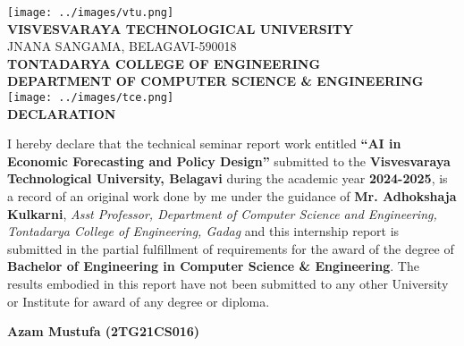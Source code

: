 \begin{titlepage}
    \thispagestyle{empty}
    \centering

    \texttt{[image: ../images/vtu.png]}\\[0.3cm]

    {\LARGE\bfseries{VISVESVARAYA TECHNOLOGICAL UNIVERSITY}}\\[0.2cm]
    {\large{JNANA SANGAMA, BELAGAVI-590018}}\\[0.3cm]

    {\Large\bfseries{TONTADARYA COLLEGE OF ENGINEERING}}\\[0.15cm]
    {\large\bfseries{DEPARTMENT OF COMPUTER SCIENCE \& ENGINEERING}}\\[0.8cm]

    \texttt{[image: ../images/tce.png]}\\[0.8cm] %

    {\Large\bfseries{DECLARATION}}\\[0.8cm]

    \begin{flushleft}
        \setlength{\parindent}{0pt}
        \renewcommand{\baselinestretch}{1.3}\normalsize

        I hereby declare that the technical seminar report work entitled \textbf{{``AI in Economic Forecasting and Policy Design''}}
        submitted to the \textbf{Visvesvaraya Technological University, Belagavi} during the academic year \textbf{2024-2025},
        is a record of an original work done by me under the guidance of \textbf{Mr. Adhokshaja Kulkarni},
        \textit{Asst Professor, Department of Computer Science and Engineering, Tontadarya College of Engineering, Gadag}
        and this internship report is submitted in the partial fulfillment of requirements for the award of the degree of
        \textbf{Bachelor of Engineering in Computer Science \& Engineering}. The results embodied in this report have not
        been submitted to any other University or Institute for award of any degree or diploma.
    \end{flushleft}

    \vfill

    \begin{flushright}
        \textbf{Azam Mustufa (2TG21CS016)}
    \end{flushright}
\end{titlepage}
